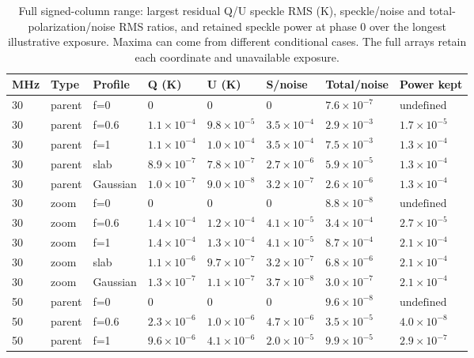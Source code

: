 \begin{table}[htbp]
\centering\small
\caption{Full signed-column range: largest residual Q/U speckle RMS (K), speckle/noise and total-polarization/noise RMS ratios, and retained speckle power at phase 0 over the longest illustrative exposure. Maxima can come from different conditional cases. The full arrays retain each coordinate and unavailable exposure.}
\label{tab:decisions}
\begin{tabular}{llllllll}
\toprule
MHz & Type & Profile & Q (K) & U (K) & S/noise & Total/noise & Power kept\\
\midrule
30 & parent & f=0 & $0$ & $0$ & $0$ & $7.6\times10^{-7}$ & $\text{undefined}$\\
30 & parent & f=0.6 & $1.1\times10^{-4}$ & $9.8\times10^{-5}$ & $3.5\times10^{-4}$ & $2.9\times10^{-3}$ & $1.7\times10^{-5}$\\
30 & parent & f=1 & $1.1\times10^{-4}$ & $1.0\times10^{-4}$ & $3.5\times10^{-4}$ & $7.5\times10^{-3}$ & $1.3\times10^{-4}$\\
30 & parent & slab & $8.9\times10^{-7}$ & $7.8\times10^{-7}$ & $2.7\times10^{-6}$ & $5.9\times10^{-5}$ & $1.3\times10^{-4}$\\
30 & parent & Gaussian & $1.0\times10^{-7}$ & $9.0\times10^{-8}$ & $3.2\times10^{-7}$ & $2.6\times10^{-6}$ & $1.3\times10^{-4}$\\
30 & zoom & f=0 & $0$ & $0$ & $0$ & $8.8\times10^{-8}$ & $\text{undefined}$\\
30 & zoom & f=0.6 & $1.4\times10^{-4}$ & $1.2\times10^{-4}$ & $4.1\times10^{-5}$ & $3.4\times10^{-4}$ & $2.7\times10^{-5}$\\
30 & zoom & f=1 & $1.4\times10^{-4}$ & $1.3\times10^{-4}$ & $4.1\times10^{-5}$ & $8.7\times10^{-4}$ & $2.1\times10^{-4}$\\
30 & zoom & slab & $1.1\times10^{-6}$ & $9.7\times10^{-7}$ & $3.2\times10^{-7}$ & $6.8\times10^{-6}$ & $2.1\times10^{-4}$\\
30 & zoom & Gaussian & $1.3\times10^{-7}$ & $1.1\times10^{-7}$ & $3.7\times10^{-8}$ & $3.0\times10^{-7}$ & $2.1\times10^{-4}$\\
50 & parent & f=0 & $0$ & $0$ & $0$ & $9.6\times10^{-8}$ & $\text{undefined}$\\
50 & parent & f=0.6 & $2.3\times10^{-6}$ & $1.0\times10^{-6}$ & $4.7\times10^{-6}$ & $3.5\times10^{-5}$ & $4.0\times10^{-8}$\\
50 & parent & f=1 & $9.6\times10^{-6}$ & $4.1\times10^{-6}$ & $2.0\times10^{-5}$ & $9.9\times10^{-5}$ & $2.9\times10^{-7}$\\

\end{tabular}
\end{table}
